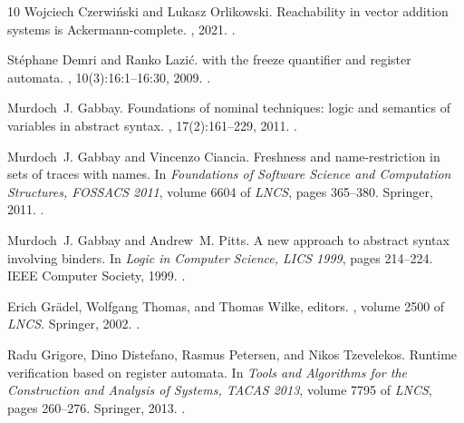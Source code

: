 \documentclass[10pt,a4paper]{amsart}
\numberwithin{equation}{section}
\newcommand{\+}[1]{\mathcal{#1}\xspace}
\theoremstyle{definition}
\begin{document}
\begin{thebibliography}{10}
Wojciech Czerwi{\'n}ski and Lukasz Orlikowski.
\newblock Reachability in vector addition systems is {A}ckermann-complete.
, 2021.
\newblock \href {http://arxiv.org/abs/2104.13866} {}.

St{\'{e}}phane Demri and Ranko Lazi{\'c}.
 with the freeze quantifier and register automata.
, 10(3):16:1--16:30, 2009.
\newblock \href {http://dx.doi.org/10.1145/1507244.1507246}
  {}.

Murdoch~J. Gabbay.
\newblock Foundations of nominal techniques: logic and semantics of variables
  in abstract syntax.
, 17(2):161--229, 2011.
\newblock \href {http://dx.doi.org/10.2178/bsl/1305810911}
  {}.

Murdoch~J. Gabbay and Vincenzo Ciancia.
\newblock Freshness and name-restriction in sets of traces with names.
\newblock In {\em Foundations of Software Science and Computation Structures,
  {FOSSACS} 2011}, volume 6604 of {\em LNCS}, pages 365--380. Springer, 2011.
\newblock \href {http://dx.doi.org/10.1007/978-3-642-19805-2}
  {}.

Murdoch~J. Gabbay and Andrew~M. Pitts.
\newblock A new approach to abstract syntax involving binders.
\newblock In {\em Logic in Computer Science, LICS 1999}, pages 214--224. {IEEE}
  Computer Society, 1999.
\newblock \href {http://dx.doi.org/10.1109/LICS.1999.782617}
  {}.

Erich Gr{\"{a}}del, Wolfgang Thomas, and Thomas Wilke, editors.
, volume 2500 of {\em LNCS}. Springer, 2002.
\newblock \href {http://dx.doi.org/10.1007/3-540-36387-4}
  {}.

Radu Grigore, Dino Distefano, Rasmus Petersen, and Nikos Tzevelekos.
\newblock Runtime verification based on register automata.
\newblock In {\em Tools and Algorithms for the Construction and Analysis of
  Systems, {TACAS} 2013}, volume 7795 of {\em LNCS}, pages 260--276. Springer,
  2013.
\newblock \href {http://dx.doi.org/10.1007/978-3-642-36742-7_19}
  {}.


\end{thebibliography}
\end{document}
